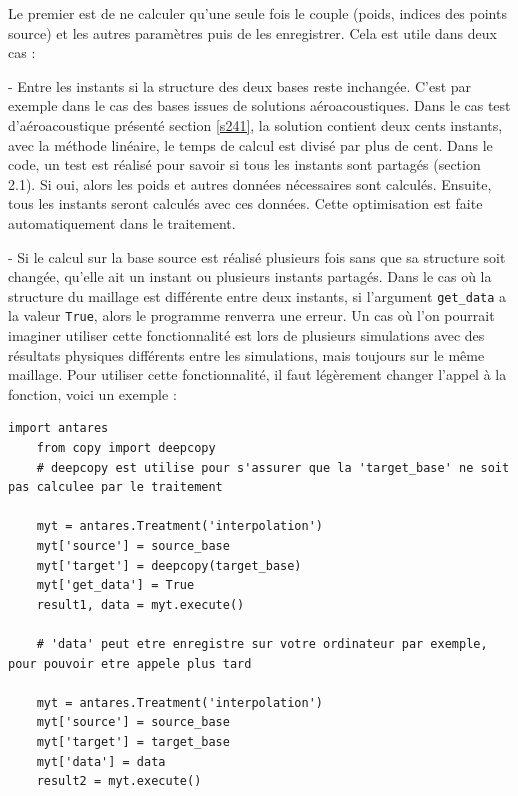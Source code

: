 Le premier est de ne calculer qu'une seule fois le couple (poids, indices des points source) et les autres paramètres puis de les enregistrer. Cela est utile dans deux cas : %

- Entre les instants si la structure des deux bases reste inchangée.
C'est par exemple dans le cas des bases issues de solutions aéroacoustiques. Dans le cas test d'aéroacoustique présenté section \ref{s241}, la solution contient deux cents instants, avec la méthode linéaire, le temps de calcul est divisé par plus de cent. Dans le code, un test est réalisé pour savoir si tous les instants sont partagés (section 2.1). Si oui, alors les poids et autres données nécessaires sont calculés. Ensuite, tous les instants seront calculés avec ces données.
Cette optimisation est faite automatiquement dans le traitement.

- Si le calcul sur la base source est réalisé plusieurs fois sans que sa structure soit changée, qu'elle ait un instant ou plusieurs instants partagés. Dans le cas où la structure du maillage est différente entre deux instants, si l'argument \texttt{get\_data} a la valeur \texttt{True}, alors le programme renverra une erreur.
Un cas où l'on pourrait imaginer utiliser cette fonctionnalité est lors de plusieurs simulations avec des résultats physiques différents entre les simulations, mais toujours sur le même maillage. Pour utiliser cette fonctionnalité, il faut légèrement changer l'appel à la fonction, voici un exemple :

\begin{lstlisting}[caption=Exemple de réutilisation des données, label={lst:antares}]
    import antares
    from copy import deepcopy
    # deepcopy est utilise pour s'assurer que la 'target_base' ne soit pas calculee par le traitement

    myt = antares.Treatment('interpolation')
    myt['source'] = source_base
    myt['target'] = deepcopy(target_base)
    myt['get_data'] = True
    result1, data = myt.execute()

    # 'data' peut etre enregistre sur votre ordinateur par exemple, pour pouvoir etre appele plus tard

    myt = antares.Treatment('interpolation')
    myt['source'] = source_base
    myt['target'] = target_base
    myt['data'] = data
    result2 = myt.execute()
\end{lstlisting}

